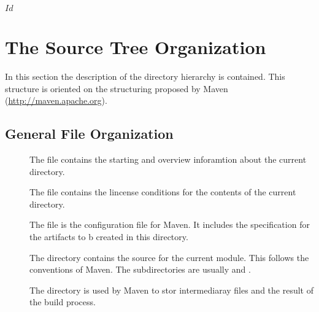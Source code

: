 \SVN$Id$
\chapter{The Source Tree Organization}

In this section the description of the directory hierarchy is
contained. This structure is oriented on the structuring proposed by
Maven (\url{http://maven.apache.org}).


\section{General File Organization}

\begin{description}
\item[] The file  contains the
  starting and overview inforamtion about the current directory.
\item[] The file  contains the
  lincense conditions for the contents of the current directory.
\item[] The file  is the configuration
  file for Maven. It includes the specification for the artifacts to b
  created in this directory.
\item[] The directory  contains the source for the
  current module. This follows the conventions of Maven. The
  subdirectories are usually  and . 
\item[] The directory  is used by Maven to
  stor intermediaray files and the result of the build process.
\end{description}


